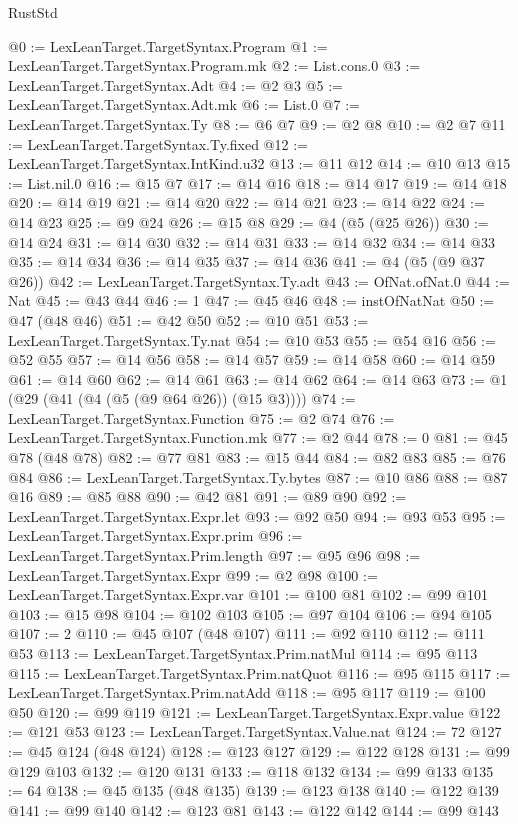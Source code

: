 \begin{lexlean}{RustStd}
\begin{coremodule}
@0 := LexLeanTarget.TargetSyntax.Program
@1 := LexLeanTarget.TargetSyntax.Program.mk
@2 := List.cons.{0}
@3 := LexLeanTarget.TargetSyntax.Adt
@4 := @2 @3
@5 := LexLeanTarget.TargetSyntax.Adt.mk
@6 := List.{0}
@7 := LexLeanTarget.TargetSyntax.Ty
@8 := @6 @7
@9 := @2 @8
@10 := @2 @7
@11 := LexLeanTarget.TargetSyntax.Ty.fixed
@12 := LexLeanTarget.TargetSyntax.IntKind.u32
@13 := @11 @12
@14 := @10 @13
@15 := List.nil.{0}
@16 := @15 @7
@17 := @14 @16
@18 := @14 @17
@19 := @14 @18
@20 := @14 @19
@21 := @14 @20
@22 := @14 @21
@23 := @14 @22
@24 := @14 @23
@25 := @9 @24
@26 := @15 @8
@29 := @4 (@5 (@25 @26))
@30 := @14 @24
@31 := @14 @30
@32 := @14 @31
@33 := @14 @32
@34 := @14 @33
@35 := @14 @34
@36 := @14 @35
@37 := @14 @36
@41 := @4 (@5 (@9 @37 @26))
@42 := LexLeanTarget.TargetSyntax.Ty.adt
@43 := OfNat.ofNat.{0}
@44 := Nat
@45 := @43 @44
@46 := 1
@47 := @45 @46
@48 := instOfNatNat
@50 := @47 (@48 @46)
@51 := @42 @50
@52 := @10 @51
@53 := LexLeanTarget.TargetSyntax.Ty.nat
@54 := @10 @53
@55 := @54 @16
@56 := @52 @55
@57 := @14 @56
@58 := @14 @57
@59 := @14 @58
@60 := @14 @59
@61 := @14 @60
@62 := @14 @61
@63 := @14 @62
@64 := @14 @63
@73 := @1 (@29 (@41 (@4 (@5 (@9 @64 @26)) (@15 @3))))
@74 := LexLeanTarget.TargetSyntax.Function
@75 := @2 @74
@76 := LexLeanTarget.TargetSyntax.Function.mk
@77 := @2 @44
@78 := 0
@81 := @45 @78 (@48 @78)
@82 := @77 @81
@83 := @15 @44
@84 := @82 @83
@85 := @76 @84
@86 := LexLeanTarget.TargetSyntax.Ty.bytes
@87 := @10 @86
@88 := @87 @16
@89 := @85 @88
@90 := @42 @81
@91 := @89 @90
@92 := LexLeanTarget.TargetSyntax.Expr.let
@93 := @92 @50
@94 := @93 @53
@95 := LexLeanTarget.TargetSyntax.Expr.prim
@96 := LexLeanTarget.TargetSyntax.Prim.length
@97 := @95 @96
@98 := LexLeanTarget.TargetSyntax.Expr
@99 := @2 @98
@100 := LexLeanTarget.TargetSyntax.Expr.var
@101 := @100 @81
@102 := @99 @101
@103 := @15 @98
@104 := @102 @103
@105 := @97 @104
@106 := @94 @105
@107 := 2
@110 := @45 @107 (@48 @107)
@111 := @92 @110
@112 := @111 @53
@113 := LexLeanTarget.TargetSyntax.Prim.natMul
@114 := @95 @113
@115 := LexLeanTarget.TargetSyntax.Prim.natQuot
@116 := @95 @115
@117 := LexLeanTarget.TargetSyntax.Prim.natAdd
@118 := @95 @117
@119 := @100 @50
@120 := @99 @119
@121 := LexLeanTarget.TargetSyntax.Expr.value
@122 := @121 @53
@123 := LexLeanTarget.TargetSyntax.Value.nat
@124 := 72
@127 := @45 @124 (@48 @124)
@128 := @123 @127
@129 := @122 @128
@131 := @99 @129 @103
@132 := @120 @131
@133 := @118 @132
@134 := @99 @133
@135 := 64
@138 := @45 @135 (@48 @135)
@139 := @123 @138
@140 := @122 @139
@141 := @99 @140
@142 := @123 @81
@143 := @122 @142
@144 := @99 @143

\end{coremodule}
\end{lexlean}
